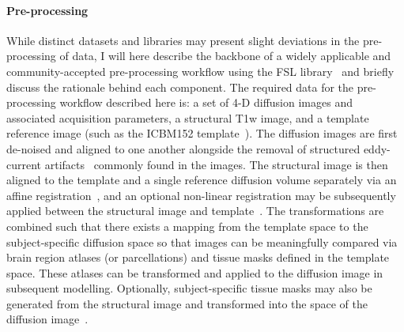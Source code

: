 \paragraph*{Pre-processing}
While distinct datasets and libraries may present slight deviations in the pre-processing of data, I will here describe
the backbone of a widely applicable and community-accepted pre-processing workflow using the FSL
library~\cite{WOOLRICH2009S173,jenkinson2012fsl,Glasser2013-vf} and briefly discuss the rationale behind each
component. The required data for the pre-processing workflow described here is: a set of 4-D diffusion images and
associated acquisition parameters, a structural T1w image, and a template reference image (such as the ICBM152
template~\cite{lancaster2007bias}). The diffusion images are first de-noised and aligned to one another alongside the
removal of structured eddy-current artifacts~\cite{andersson2016integrated} commonly found in the images. The structural
image is then aligned to the template and a single reference diffusion volume separately via an affine
registration~\cite{jenkinson2001global}, and an optional non-linear registration may be subsequently applied between
the structural image and template~\cite{jenkinson2012fsl}. The transformations are combined such that there exists a
mapping from the template space to the subject-specific diffusion space so that images can be meaningfully compared via
brain region atlases (or parcellations) and tissue masks defined in the template space. These atlases can be transformed
and applied to the diffusion image in subsequent modelling. Optionally, subject-specific tissue masks may also be
generated from the structural image and transformed into the space of the diffusion image~\cite{zhang2001segmentation}.

